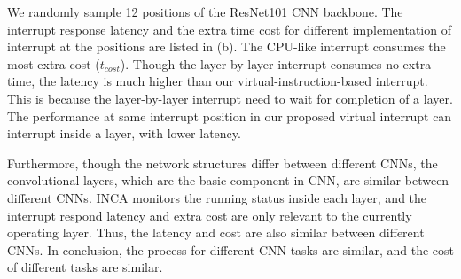 % 


We randomly sample 12 positions of the ResNet101 CNN backbone. The interrupt response latency and the extra time cost for different implementation of interrupt at the positions are listed in (b).
The CPU-like interrupt consumes the most extra cost ($t_{cost}$). Though the layer-by-layer interrupt consumes no extra time, the latency is much higher than our virtual-instruction-based interrupt. 
This is because the layer-by-layer interrupt need to wait for completion of a layer. The performance at same interrupt position in our proposed virtual interrupt can interrupt inside a layer, with lower latency.

Furthermore, though the network structures differ between different CNNs, the convolutional layers, which are the basic component in CNN, are similar between different CNNs. INCA monitors the running status inside each layer, and the interrupt respond latency and extra cost are only relevant to the currently operating layer. Thus, the latency and cost are also similar between different CNNs. In conclusion, the process for different CNN tasks are similar, and the cost of different tasks are similar.



